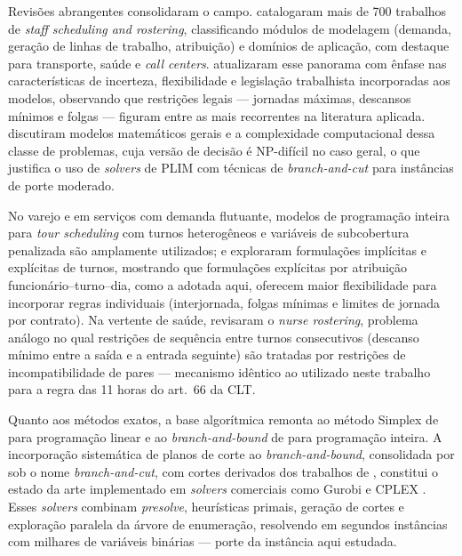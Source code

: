 \documentclass[12pt,a4paper]{article}
\begin{document}
Revisões abrangentes consolidaram o campo. \cite{ernst2004} catalogaram mais
de 700 trabalhos de \emph{staff scheduling and rostering}, classificando
módulos de modelagem (demanda, geração de linhas de trabalho, atribuição) e
domínios de aplicação, com destaque para transporte, saúde e \emph{call
centers}. \cite{vandenbergh2013} atualizaram esse panorama com ênfase nas
características de incerteza, flexibilidade e legislação trabalhista
incorporadas aos modelos, observando que restrições legais --- jornadas
máximas, descansos mínimos e folgas --- figuram entre as mais recorrentes na
literatura aplicada. \cite{brucker2011} discutiram modelos matemáticos gerais
e a complexidade computacional dessa classe de problemas, cuja versão de
decisão é NP-difícil no caso geral, o que justifica o uso de \emph{solvers}
de PLIM com técnicas de \emph{branch-and-cut} para instâncias de porte
moderado.

No varejo e em serviços com demanda flutuante, modelos de programação inteira
para \emph{tour scheduling} com turnos heterogêneos e variáveis de
subcobertura penalizada são amplamente utilizados; \cite{thompson1995} e
\cite{aykin1996} exploraram formulações implícitas e explícitas de turnos,
mostrando que formulações explícitas por atribuição
funcionário--turno--dia, como a adotada aqui, oferecem maior flexibilidade
para incorporar regras individuais (interjornada, folgas mínimas e limites de
jornada por contrato). Na vertente de saúde, \cite{burke2004} revisaram o
\emph{nurse rostering}, problema análogo no qual restrições de sequência
entre turnos consecutivos (descanso mínimo entre a saída e a entrada
seguinte) são tratadas por restrições de incompatibilidade de pares ---
mecanismo idêntico ao utilizado neste trabalho para a regra das 11 horas do
art.~66 da CLT.

Quanto aos métodos exatos, a base algorítmica remonta ao método Simplex de
\cite{dantzig1947} para programação linear e ao \emph{branch-and-bound} de
\cite{landdoig1960} para programação inteira. A incorporação sistemática de
planos de corte ao \emph{branch-and-bound}, consolidada por
\cite{padberg1991} sob o nome \emph{branch-and-cut}, com cortes derivados dos
trabalhos de \cite{gomory1958}, constitui o estado da arte implementado em
\emph{solvers} comerciais como Gurobi e CPLEX \cite{gurobi,bixby2012}. Esses
\emph{solvers} combinam \emph{presolve}, heurísticas primais, geração de
cortes e exploração paralela da árvore de enumeração, resolvendo em segundos
instâncias com milhares de variáveis binárias --- porte da instância aqui
estudada.
\end{document}
